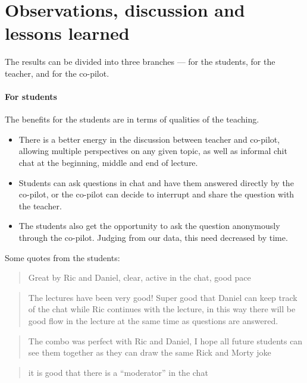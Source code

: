 \documentclass{article}
\begin{document}
\section*{Observations, discussion and lessons learned}

The results can be divided into three branches --- for the students, for the 
teacher, and for the co-pilot.

\paragraph{For students}

The benefits for the students are in terms of qualities of the teaching.

\begin{itemize}
  \item There is a better energy in the discussion between teacher and 
    co-pilot, allowing multiple perspectives on any given topic, as well as 
    informal chit chat at the beginning, middle and end of lecture.

  \item Students can ask questions in chat and have them answered directly by 
    the co-pilot, or the co-pilot can decide to interrupt and share the 
    question with the teacher.

  \item The students also get the opportunity to ask the question anonymously 
    through the co-pilot.
    Judging from our data, this need decreased by time.
\end{itemize}

Some quotes from the students:
\begin{quote}
Great by Ric and Daniel, clear, active in the chat, good pace
\end{quote}

\begin{quote}
The lectures have been very good! Super good that Daniel can keep track of
the chat while Ric continues with the lecture, in this way there will be
good flow in the lecture at the same time as questions are answered.
\end{quote}

\begin{quote}
The combo was perfect with Ric and Daniel, I hope all future students can
see them together as they can draw the same Rick and Morty joke
\end{quote}

\begin{quote}
  it is good that there is a \enquote{moderator} in the chat
\end{quote}
\end{document}
